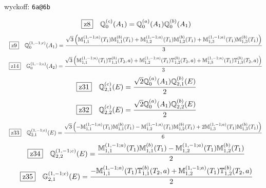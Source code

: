 \documentclass[fleqn,10pt,landscape]{jsarticle}
\begin{document}
\noindent\quad * wyckoff: \texttt{6a@6b}

\begin{dmath*}
\hspace*{3mm}\fbox{z8}\quad \mathbb{Q}_{0}^{(c)}(A_{1})=\mathbb{Q}_{0}^{(a)}(A_{1}) \mathbb{Q}_{0}^{(b)}(A_{1})
\end{dmath*}
\begin{dmath*}
\hspace*{3mm}\fbox{z9}\quad \mathbb{Q}_{0}^{(1,-1;c)}(A_{1})=\frac{\sqrt{3} \left(\mathbb{M}_{1,1}^{(1,-1;a)}(T_{1}) \mathbb{M}_{1,1}^{(b)}(T_{1}) + \mathbb{M}_{1,2}^{(1,-1;a)}(T_{1}) \mathbb{M}_{1,2}^{(b)}(T_{1}) + \mathbb{M}_{1,3}^{(1,-1;a)}(T_{1}) \mathbb{M}_{1,3}^{(b)}(T_{1})\right)}{3}
\end{dmath*}
\begin{dmath*}
\hspace*{3mm}\fbox{z14}\quad \mathbb{G}_{0}^{(1,-1;c)}(A_{2})=\frac{\sqrt{3} \left(\mathbb{M}_{1,1}^{(1,-1;a)}(T_{1}) \mathbb{T}_{1,1}^{(b)}(T_{2},a) + \mathbb{M}_{1,2}^{(1,-1;a)}(T_{1}) \mathbb{T}_{1,2}^{(b)}(T_{2},a) + \mathbb{M}_{1,3}^{(1,-1;a)}(T_{1}) \mathbb{T}_{1,3}^{(b)}(T_{2},a)\right)}{3}
\end{dmath*}
\begin{dmath*}
\hspace*{3mm}\fbox{z31}\quad \mathbb{Q}_{2,1}^{(c)}(E)=\frac{\sqrt{2} \mathbb{Q}_{0}^{(a)}(A_{1}) \mathbb{Q}_{2,1}^{(b)}(E)}{2}
\end{dmath*}
\begin{dmath*}
\hspace*{3mm}\fbox{z32}\quad \mathbb{Q}_{2,2}^{(c)}(E)=\frac{\sqrt{2} \mathbb{Q}_{0}^{(a)}(A_{1}) \mathbb{Q}_{2,2}^{(b)}(E)}{2}
\end{dmath*}
\begin{dmath*}
\hspace*{3mm}\fbox{z33}\quad \mathbb{Q}_{2,1}^{(1,-1;c)}(E)=\frac{\sqrt{3} \left(- \mathbb{M}_{1,1}^{(1,-1;a)}(T_{1}) \mathbb{M}_{1,1}^{(b)}(T_{1}) - \mathbb{M}_{1,2}^{(1,-1;a)}(T_{1}) \mathbb{M}_{1,2}^{(b)}(T_{1}) + 2 \mathbb{M}_{1,3}^{(1,-1;a)}(T_{1}) \mathbb{M}_{1,3}^{(b)}(T_{1})\right)}{6}
\end{dmath*}
\begin{dmath*}
\hspace*{3mm}\fbox{z34}\quad \mathbb{Q}_{2,2}^{(1,-1;c)}(E)=\frac{\mathbb{M}_{1,1}^{(1,-1;a)}(T_{1}) \mathbb{M}_{1,1}^{(b)}(T_{1}) - \mathbb{M}_{1,2}^{(1,-1;a)}(T_{1}) \mathbb{M}_{1,2}^{(b)}(T_{1})}{2}
\end{dmath*}
\begin{dmath*}
\hspace*{3mm}\fbox{z35}\quad \mathbb{G}_{2,1}^{(1,-1;c)}(E)=\frac{- \mathbb{M}_{1,1}^{(1,-1;a)}(T_{1}) \mathbb{T}_{1,1}^{(b)}(T_{2},a) + \mathbb{M}_{1,2}^{(1,-1;a)}(T_{1}) \mathbb{T}_{1,2}^{(b)}(T_{2},a)}{2}
\end{dmath*}
\end{document}
